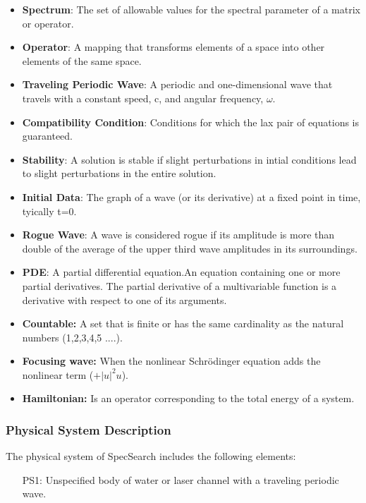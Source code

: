 \documentclass[12pt]{article}
\begin{document}
\begin{itemize}

\item \textbf{Spectrum}: The set of allowable values for the spectral parameter 
of a matrix or operator.
\item \textbf{Operator}: A mapping that transforms elements of a space into 
other elements of the same space. 
\item \textbf{Traveling Periodic Wave}: A periodic and one-dimensional wave 
that travels with a constant speed, c, and angular frequency, $\omega$. 
\item \textbf{Compatibility Condition}: Conditions for which the lax pair of 
equations is guaranteed. 
\item \textbf{Stability}: A solution is stable if slight perturbations in 
intial conditions lead 
to slight perturbations in the entire solution.
\item \textbf{Initial Data}: The graph of a wave (or its derivative) 
at a fixed point in time, tyically t=0.
\item \textbf{Rogue Wave}: A wave is considered rogue if its amplitude is more 
than double of the average of the upper third wave amplitudes in its 
surroundings. 
\item \textbf{PDE}: A partial differential equation.An equation containing one 
or more partial derivatives. The partial derivative of a multivariable function 
is a derivative with respect to one of its arguments. 
\item \textbf{Countable:} A set that is finite or has the same cardinality as 
the natural numbers (1,2,3,4,5 ....). 
\item \textbf{Focusing wave:} When the nonlinear Schr\"{o}dinger equation adds 
the 
nonlinear term ($+|u|^{2}u$).  
\item \textbf{Hamiltonian:} Is an operator corresponding to the total energy of 
a system. 

\end{itemize}

\subsubsection{Physical System Description}

The physical system of SpecSearch includes the following elements:

\begin{itemize}

\item[PS1:] 
Unspecified body of water or laser channel with a traveling periodic 
wave.

\end{itemize}
\end{document}

